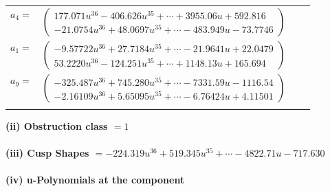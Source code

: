 \documentclass[1p]{elsarticle_modified}
\theoremstyle{definition}
\begin{document}
\begin{tabular}{m{7pt} m{180pt} m{7pt} m{180pt} }
\flushright $a_{4}=$&$\begin{pmatrix}177.071 u^{36}-406.626 u^{35}+\cdots+3955.06 u+592.816\\-21.0754 u^{36}+48.0697 u^{35}+\cdots-483.949 u-73.7746\end{pmatrix}$ \\
\flushright $a_{1}=$&$\begin{pmatrix}-9.57722 u^{36}+27.7184 u^{35}+\cdots-21.9641 u+22.0479\\53.2220 u^{36}-124.251 u^{35}+\cdots+1148.13 u+165.694\end{pmatrix}$ \\
\flushright $a_{9}=$&$\begin{pmatrix}-325.487 u^{36}+745.280 u^{35}+\cdots-7331.59 u-1116.54\\-2.16109 u^{36}+5.65095 u^{35}+\cdots-6.76424 u+4.11501\end{pmatrix}$\\&\end{tabular}
\flushleft \textbf{(ii) Obstruction class $= 1$}\\~\\
\flushleft \textbf{(iii) Cusp Shapes $= -224.319 u^{36}+519.345 u^{35}+\cdots-4822.71 u-717.630$}\\~\\
\newpage\renewcommand{\arraystretch}{1}
\flushleft \textbf{(iv) u-Polynomials at the component}\newline \\
\end{document}

